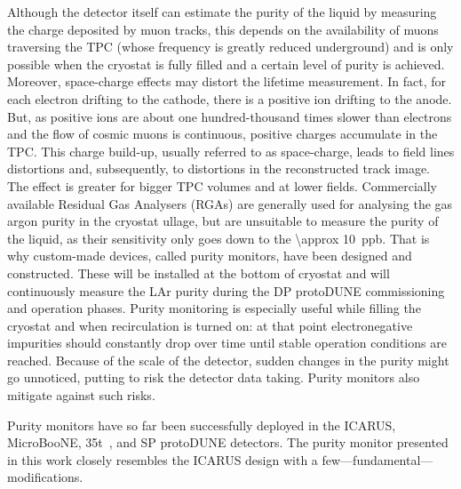 \documentclass[a4paper,11pt]{article}
\begin{document}
Although the detector itself can estimate the purity of the liquid by measuring the charge deposited by muon tracks, this depends on the availability of muons traversing the TPC (whose frequency is greatly reduced underground) and is only possible when the cryostat is fully filled and a certain level of purity is achieved. Moreover, space-charge effects may distort the lifetime measurement. In fact, for each electron drifting to the cathode, there is a positive ion drifting to the anode. But, as positive ions are about one hundred-thousand times slower than electrons and the flow of cosmic muons is continuous, positive charges accumulate in the TPC. This charge build-up, usually referred to as space-charge, leads to field lines distortions and, subsequently, to distortions in the reconstructed track image. The effect is greater for bigger TPC volumes and at lower fields.
Commercially available Residual Gas Analysers (RGAs) are generally used for analysing the gas argon purity in the cryostat ullage, but are unsuitable to measure the purity of the liquid, as their sensitivity only goes down to the \SI{\approx 10}{ppb}. 
That is why custom-made devices, called purity monitors, have been designed and constructed. These will be installed at the bottom of cryostat and will continuously measure the LAr purity during the DP protoDUNE commissioning and operation phases. 
Purity monitoring is especially useful while filling the cryostat and when recirculation is turned on: at that point electronegative impurities should constantly drop over time until stable operation conditions are reached. 
Because of the scale of the detector, sudden changes in the purity might go unnoticed, putting to risk the detector data taking. Purity monitors also mitigate against such risks. 

Purity monitors have so far been successfully deployed in the ICARUS, MicroBooNE, 35t~\cite{IDRvol2}, and SP protoDUNE detectors.
The purity monitor presented in this work closely resembles the ICARUS design with a few---fundamental---modifications.
\end{document}
